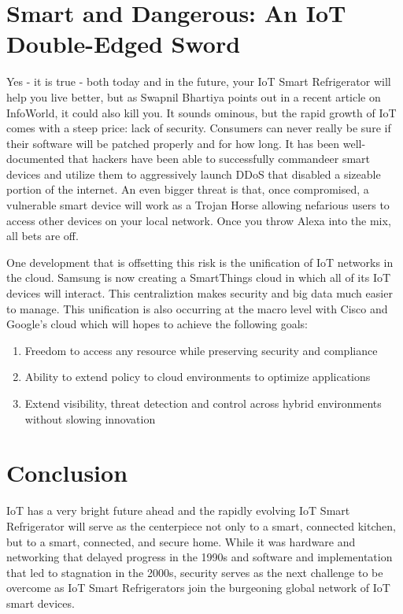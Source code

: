 \documentclass[sigconf]{acmart}
\begin{document}
\section{Smart and Dangerous: An IoT Double-Edged Sword}

Yes - it is true - both today and in the future, your IoT Smart Refrigerator will help you live better, but as Swapnil Bhartiya points out in a recent article on InfoWorld\cite{Bhartiya2017}, it could also kill you. It sounds ominous, but the rapid growth of IoT comes with a steep price: lack of security. Consumers can never really be sure if their software will be patched properly and for how long. It has been well-documented that hackers have been able to successfully commandeer smart devices and utilize them to aggressively launch DDoS that disabled a sizeable portion of the internet. An even bigger threat is that, once compromised, a vulnerable smart device will work as a Trojan Horse allowing nefarious users to access other devices on your local network. Once you throw Alexa into the mix, all bets are off. 
\par
One development that is offsetting this risk is the unification of IoT networks in the cloud. Samsung is now creating a SmartThings cloud in which all of its IoT devices will interact. This centraliztion makes security and big data much easier to manage. This unification is also occurring at the macro level with Cisco and Google's cloud\cite{Cisco2017} which will hopes to achieve the following goals:

\begin{enumerate}
  \item Freedom to access any resource while preserving security and compliance
  \item Ability to extend policy to cloud environments to optimize applications
  \item Extend visibility, threat detection and control across hybrid environments without slowing innovation
\end{enumerate}

\section{Conclusion}

IoT has a very bright future ahead and the rapidly evolving IoT Smart Refrigerator will serve as the centerpiece not only to a smart, connected kitchen, but to a smart, connected, and secure home. While it was hardware and networking that delayed progress in the 1990s and software and implementation that led to stagnation in the 2000s, security serves as the next challenge to be overcome as IoT Smart Refrigerators join the burgeoning global network of IoT smart devices.


 
\end{document}
